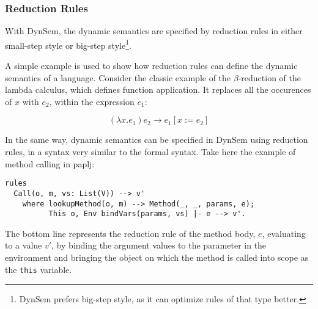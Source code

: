 \subsubsection{Reduction Rules}
\label{sec:orgheadline6}
With DynSem, the dynamic semantics are specified by reduction rules in
either small-step style or big-step style\footnote{DynSem
prefers big-step style, as it can optimize rules of that type better.}.

A simple example is used to show how reduction rules can define the
dynamic semantics of a language. Consider the classic example of the
\(\beta\)-reduction of the lambda calculus, which defines function
application. It replaces all the occurences of \(x\) with \(e_2\), within
the expression \(e_1\):

\begin{equation}
(\lambda x.e_1) e_2 \rightarrow e_1[x := e_2]
\end{equation}

In the same way, dynamic semantics can be specified in DynSem using
reduction rules, in a syntax very similar to the formal syntax. Take
here the example of method calling in paplj:

\begin{verbatim}
rules
  Call(o, m, vs: List(V)) --> v'
    where lookupMethod(o, m) --> Method(_, _, params, e);
          This o, Env bindVars(params, vs) |- e --> v'.
\end{verbatim}

The bottom line represents the reduction rule of the method body, \(e\),
evaluating to a value \(v'\), by binding the argument values to the
parameter in the environment and bringing the object on which the
method is called into scope as the \texttt{this} variable.
